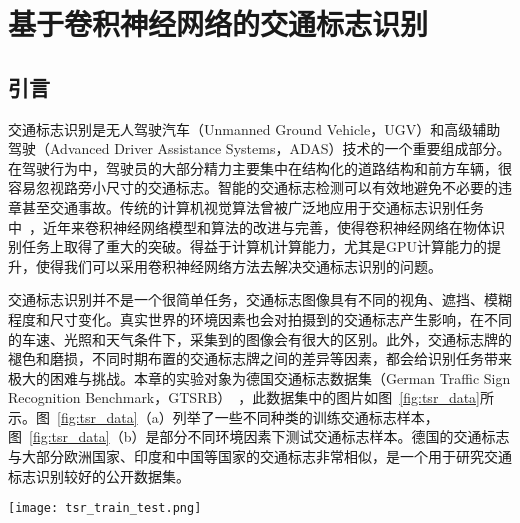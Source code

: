 \chapter{基于卷积神经网络的交通标志识别}
\label{cha:seg}

\section{引言}
\label{sec:seg:introduction}

交通标志识别是无人驾驶汽车（Unmanned Ground Vehicle，UGV）和高级辅助驾驶（Advanced Driver Assistance Systems，ADAS）技术的一个重要组成部分。在驾驶行为中，驾驶员的大部分精力主要集中在结构化的道路结构和前方车辆，很容易忽视路旁小尺寸的交通标志。智能的交通标志检测可以有效地避免不必要的违章甚至交通事故。传统的计算机视觉算法曾被广泛地应用于交通标志识别任务中~\cite{le2010real}，近年来卷积神经网络模型和算法的改进与完善，使得卷积神经网络在物体识别任务上取得了重大的突破。得益于计算机计算能力，尤其是GPU计算能力的提升，使得我们可以采用卷积神经网络方法去解决交通标志识别的问题。

交通标志识别并不是一个很简单任务，交通标志图像具有不同的视角、遮挡、模糊程度和尺寸变化。真实世界的环境因素也会对拍摄到的交通标志产生影响，在不同的车速、光照和天气条件下，采集到的图像会有很大的区别。此外，交通标志牌的褪色和磨损，不同时期布置的交通标志牌之间的差异等因素，都会给识别任务带来极大的困难与挑战。本章的实验对象为德国交通标志数据集（German Traffic Sign Recognition Benchmark，GTSRB）~\cite{stallkamp2012man}，此数据集中的图片如图~\ref{fig:tsr_data}所示。图~\ref{fig:tsr_data}（a）列举了一些不同种类的训练交通标志样本，图~\ref{fig:tsr_data}（b）是部分不同环境因素下测试交通标志样本。德国的交通标志与大部分欧洲国家、印度和中国等国家的交通标志非常相似，是一个用于研究交通标志识别较好的公开数据集。

\begin{figure*}[t]
\centering
\texttt{[image: tsr\_train\_test.png]}
\caption{GTSRB图像样本。图中（a）是一些不同种类的训练交通标志样本，（b）是部分不同环境因素下测试交通标志样本。交通标志图像具有不同的视角、遮挡、模糊程度和尺寸变化。真实世界的环境因素也会对拍摄到的交通标志产生影响，在不同的车速、光照和天气条件下，采集到的图像会有很大的区别。此外，交通标志牌的褪色和磨损，不同时期布置的交通标志牌之间的差异等因素，都会给识别任务带来极大的困难与挑战。}
\label{fig:tsr_data}
\end{figure*}


